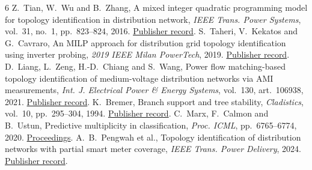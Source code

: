 \documentclass[journal,onecolumn,11pt]{IEEEtran}
\begin{document}
\begin{thebibliography}{6}
 Z.~Tian, W.~Wu and B.~Zhang, A mixed integer quadratic programming model for topology
identification in distribution network, \emph{IEEE Trans. Power Systems}, vol.~31, no.~1, pp.~823--824, 2016.
\href{https://doi.org/10.1109/TPWRS.2015.2394454}{Publisher record}.
 S.~Taheri, V.~Kekatos and G.~Cavraro, An MILP approach for distribution grid topology
identification using inverter probing, \emph{2019 IEEE Milan PowerTech}, 2019.
\href{https://doi.org/10.1109/PTC.2019.8810900}{Publisher record}.
 D.~Liang, L.~Zeng, H.-D.~Chiang and S.~Wang, Power flow matching-based topology identification
of medium-voltage distribution networks via AMI measurements, \emph{Int. J. Electrical Power \& Energy Systems},
vol.~130, art.~106938, 2021. \href{https://doi.org/10.1016/j.ijepes.2021.106938}{Publisher record}.
 K.~Bremer, Branch support and tree stability, \emph{Cladistics}, vol.~10, pp.~295--304, 1994.
\href{https://doi.org/10.1111/j.1096-0031.1994.tb00179.x}{Publisher record}.
 C.~Marx, F.~Calmon and B.~Ustun, Predictive multiplicity in classification, \emph{Proc. ICML},
pp.~6765--6774, 2020. \href{https://proceedings.mlr.press/v119/marx20a.html}{Proceedings}.
 A.~B.~Pengwah et al., Topology identification of distribution networks with partial smart meter
coverage, \emph{IEEE Trans. Power Delivery}, 2024. \href{https://doi.org/10.1109/TPWRD.2024.3354292}{Publisher record}.
\end{thebibliography}
\end{document}
